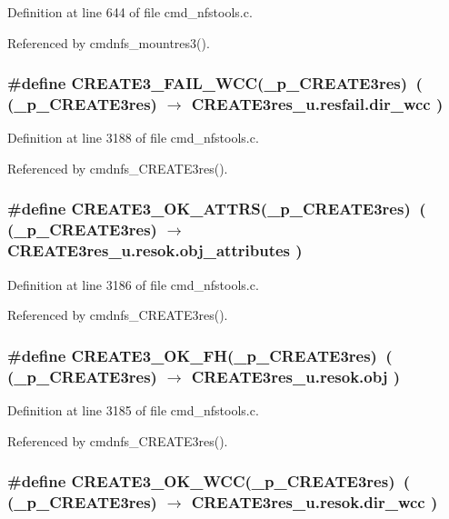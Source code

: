 Definition at line 644 of file cmd\_\-nfstools.c.

Referenced by cmdnfs\_\-mountres3().
\subsubsection{\setlength{\rightskip}{0pt plus 5cm}\#define CREATE3\_\-FAIL\_\-WCC(\_\-p\_\-CREATE3res)\ ( (\_\-p\_\-CREATE3res) $\rightarrow$ CREATE3res\_\-u.resfail.dir\_\-wcc )}\label{cmd__nfstools_8c_a28}




Definition at line 3188 of file cmd\_\-nfstools.c.

Referenced by cmdnfs\_\-CREATE3res().
\subsubsection{\setlength{\rightskip}{0pt plus 5cm}\#define CREATE3\_\-OK\_\-ATTRS(\_\-p\_\-CREATE3res)\ ( (\_\-p\_\-CREATE3res) $\rightarrow$ CREATE3res\_\-u.resok.obj\_\-attributes )}\label{cmd__nfstools_8c_a26}




Definition at line 3186 of file cmd\_\-nfstools.c.

Referenced by cmdnfs\_\-CREATE3res().
\subsubsection{\setlength{\rightskip}{0pt plus 5cm}\#define CREATE3\_\-OK\_\-FH(\_\-p\_\-CREATE3res)\ ( (\_\-p\_\-CREATE3res) $\rightarrow$ CREATE3res\_\-u.resok.obj )}\label{cmd__nfstools_8c_a25}




Definition at line 3185 of file cmd\_\-nfstools.c.

Referenced by cmdnfs\_\-CREATE3res().
\subsubsection{\setlength{\rightskip}{0pt plus 5cm}\#define CREATE3\_\-OK\_\-WCC(\_\-p\_\-CREATE3res)\ ( (\_\-p\_\-CREATE3res) $\rightarrow$ CREATE3res\_\-u.resok.dir\_\-wcc )}\label{cmd__nfstools_8c_a27}




